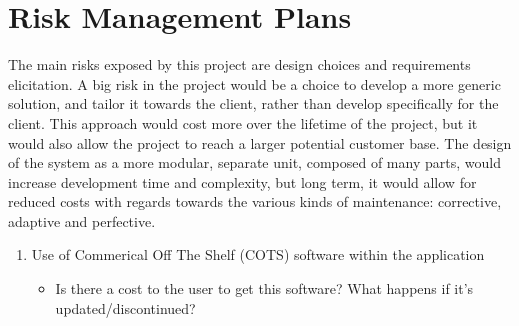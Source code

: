 \section{Risk Management Plans}

The main risks exposed by this project are design choices and requirements elicitation. A big risk in the project would be a choice to develop a more generic solution, and tailor it towards the client, rather than develop specifically for the client. This approach would cost more over the lifetime of the project, but it would also allow the project to reach a larger potential customer base. The design of the system as a more modular, separate unit, composed of many parts, would increase development time and complexity, but long term, it would allow for reduced costs with regards towards the various kinds of maintenance: corrective, adaptive and perfective. 

\begin{enumerate}
\item Use of Commerical Off The Shelf (COTS) software within the application
\begin{itemize}
\item Is there a cost to the user to get this software? What happens if it's updated/discontinued?
\end{itemize}

\end{enumerate}